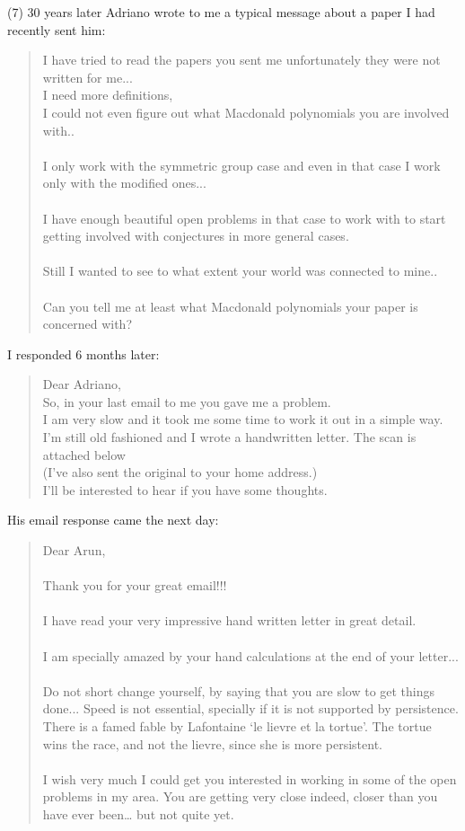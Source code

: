 \documentclass{notices}
\begin{document}
(7) 30 years later Adriano wrote to me a typical message about a paper I had recently sent him:
\begin{quote}
I have tried to read the papers you sent me
unfortunately they were not written for me...\\
I need more definitions,\\
I could not even figure out what Macdonald polynomials you are involved with..\\
\\
I only work with the symmetric group case and
even in that case
I work only with the modified ones...\\
\\
I have enough beautiful open problems in that case to work with
to start getting involved with conjectures in more general cases.\\
\\
Still I wanted to see to what extent your world was connected to mine..\\
\\
Can you tell me at least what Macdonald polynomials your paper is concerned with?
\end{quote}

I responded 6 months later:
\begin{quote}
Dear Adriano,\\
So, in your last email to me you gave me a problem.\\
I am very slow and it took me some time to work it out in a simple way.
I'm still old fashioned and I wrote a handwritten letter.
The scan is attached below\\
(I've also sent the original to your home address.)\\

I'll be interested to hear if you have some thoughts.
\end{quote}

His email response came the next day:
\begin{quote}
Dear Arun,\\
\\
Thank you for your great email!!!\\
\\
I have read your very impressive hand written letter in great detail.\\
\\
I am specially amazed by your hand calculations at the end of your letter...\\
\\
Do not short change yourself, by saying that you are slow to get things done...
Speed is not essential, specially if it is not supported by persistence.
There is a famed fable by Lafontaine `le lievre et la tortue'.
The tortue wins the race, and not the lievre, since she is more persistent.\\
\\
I wish very much I could get you interested in working in some of the open problems in my area.
You are getting very close indeed,
closer than you have ever been…
but not quite yet.
\end{quote}
\end{document}

